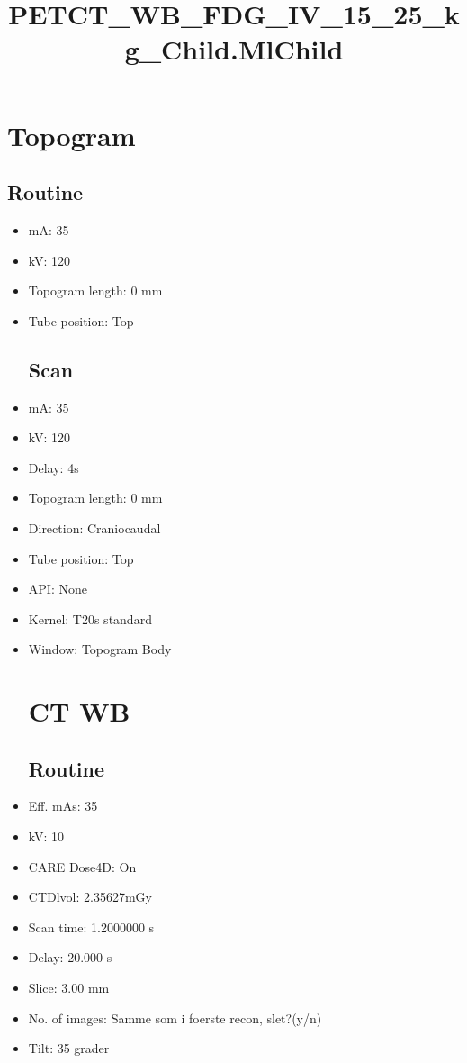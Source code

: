 \documentclass[12pt]{article}
\title{PETCT\_WB\_FDG\_IV\_15\_25\_kg\_Child.MlChild}
\begin{document}
\maketitle
\newpage
\tableofcontents
\newpage
{}


\section{Topogram}
\subsection{Routine}
 \begin{itemize}\item mA: 35\item kV: 120\item Topogram length: 0 mm\item Tube position: Top
\subsection{Scan}
\item mA: 35\item kV: 120\item Delay: 4s\item Topogram length: 0 mm\item Direction: Craniocaudal\item Tube position: Top\item API: None\item Kernel: T20s standard\item Window: Topogram Body
\section{CT WB}
\subsection{Routine}
\item Eff. mAs: 35\item kV: 10\item CARE Dose4D: On\item CTDlvol: 2.35627mGy\item Scan time: 1.2000000 s\item Delay: 20.000 s\item Slice: 3.00 mm\item No. of images: Samme som i foerste recon, slet?(y/n)\item Tilt: 35 grader

\end{itemize}
\end{document}
